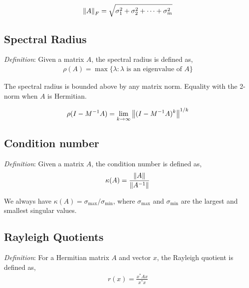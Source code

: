 \documentclass[12pt]{article}
\begin{document}
\begin{align*}
    \left\lVert A\right\rVert_F = \sqrt{\sigma_1^2 + \sigma_2^2 + \cdots + \sigma_m^2}
\end{align*}


\subsection{Spectral Radius}
\textit{Definition}: Given a matrix \( A \), the spectral radius is defined as,
\begin{align*}
    \rho(A) = \max \{ \lambda : \lambda \text{ is an eigenvalue of } A \}
\end{align*}

The spectral radius is bounded above by any matrix norm. Equality with the 2-norm when \( A \) is Hermitian.

\begin{align*}
    \rho(I-M^{-1}A) = \lim_{k\to\infty} \left\lVert(I-M^{-1}A)^k\right\rVert^{1/k}
\end{align*}


\subsection{Condition number}
\textit{Definition}: Given a matrix \( A \), the condition number is defined as,
\begin{align*}
    \kappa(A) = \frac{\left\lVert A\right\rVert}{\left\lVert A^{-1}\right\rVert}
\end{align*}

We always have \( \kappa(A) = \sigma_{\text{max}}/\sigma_{\text{min}} \), where \( \sigma_\text{max} \) and \( \sigma_\text{min} \) are the largest and smallest singular values.


\subsection{Rayleigh Quotients}
\textit{Definition}: For a Hermitian matrix \( A \) and vector \( x \), the Rayleigh quotient is defined as,
\begin{align*}
    r(x) = \frac{x^*Ax}{x^*x}
\end{align*}
\end{document}
